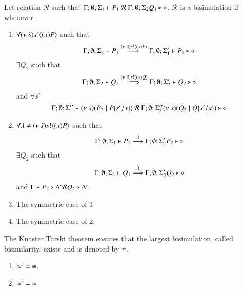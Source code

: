 \begin{definition}[Bisimulation]\rm
	Let relation $\mathcal{R}$ such that $\Gamma; \emptyset; \Sigma_1 \vdash P_1\ \mathcal{R}\ \Gamma; \emptyset; \Sigma_2 Q_1 \triangleright \diamond$.
	$\mathcal{R}$ is a bisimulation if whenever:
	\begin{enumerate}
		\item	$\forall (\nu\ \tilde{s}) s ! \langle (x)P \rangle$ such that
			\[
				\Gamma; \emptyset; \Sigma_1 \vdash P_1 \stackrel{(\nu\ \tilde{s}) s ! \langle (x)P \rangle}{\longrightarrow} \Gamma; \emptyset; \Sigma_1' \vdash P_2 \triangleright \diamond
			\]
			$\exists Q_2$ such that
			\[
				\Gamma; \emptyset; \Sigma_2 \vdash Q_1 \stackrel{(\nu\ \tilde{s}) s ! \langle (x)Q \rangle}{\Longrightarrow} \Gamma; \emptyset; \Sigma_2' \vdash Q_2 \triangleright \diamond
			\]
			and $\forall s'$
			\[
				\Gamma; \emptyset; \Sigma_1'' \proves \newsp{\tilde{s}}{P_2 \Par P \subst{s'}{x}}\ \mathcal{R}\ 
				\Gamma; \emptyset; \Sigma_2'' \newsp{\tilde{s}}{Q_2 \Par Q \subst{s'}{x}} \hastype \Proc
			\]

		\item	$\forall \lambda \not= (\nu\ \tilde{s}) s ! \langle (x)P \rangle$ such that
			\[
				\Gamma; \emptyset; \Sigma_1 \vdash P_1 \stackrel{\lambda}{\longrightarrow} \Gamma; \emptyset; \Sigma_2' P_2 \triangleright \diamond
			\]
			$\exists Q_2$ such that 
			\[
				\Gamma; \emptyset; \Sigma_2 \vdash Q_1 \stackrel{\hat{\lambda}}{\Longrightarrow} \Gamma; \emptyset; \Sigma_2' Q_2 \triangleright \diamond
			\]
			and
			$\Gamma \vdash P_2 \triangleright \Delta' \mathcal{R} Q_2 \triangleright \Delta'$.

		\item	The symmetric case of 1 
		\item	The symmetric case of 2.
	\end{enumerate}
	The Knaster Tarski theorem ensures that the largest bisimulation, called bisimilarity, exists and is denoted by $\approx$.
\end{definition}

\begin{theorem}
	\begin{enumerate}
		\item	$\approx^{c}\ =\ \cong$.
		\item	$\approx^{c}\ =\ \approx$
	\end{enumerate}
\end{theorem}


